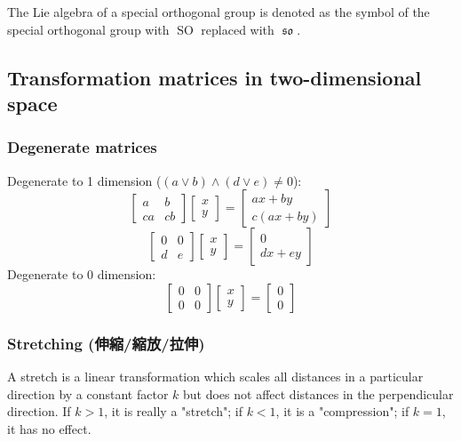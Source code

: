 \documentclass[a4paper,12pt]{report}
\begin{document}
The Lie algebra of a special orthogonal group is denoted as the symbol of the special orthogonal group with $\operatorname{SO}$ replaced with $\operatorname{\mathfrak{so}}$.
\subsection{Transformation matrices in two-dimensional space}
\subsubsection{Degenerate matrices}
Degenerate to 1 dimension ($(a\lor b)\land (d\lor e)\neq 0$):
\[\begin{bmatrix}a & b\\ca & cb\end{bmatrix}\begin{bmatrix}x \\ y\end{bmatrix}=\begin{bmatrix}ax+by \\ c(ax+by)\end{bmatrix}\]
\[\begin{bmatrix}0 & 0\\d & e\end{bmatrix}\begin{bmatrix}x \\ y\end{bmatrix}=\begin{bmatrix}0 \\ dx+ey\end{bmatrix}\]
Degenerate to 0 dimension:
\[\begin{bmatrix}0 & 0\\0 & 0\end{bmatrix}\begin{bmatrix}x \\ y\end{bmatrix}=\begin{bmatrix}0 \\ 0\end{bmatrix}\]
\subsubsection{Stretching (伸縮/縮放/拉伸)}
A stretch is a linear transformation which scales all distances in a particular direction by a constant factor $k$ but does not affect distances in the perpendicular direction. If $k > 1$, it is really a "stretch"; if $k < 1$, it is a "compression"; if $k = 1$, it has no effect.
\end{document}
